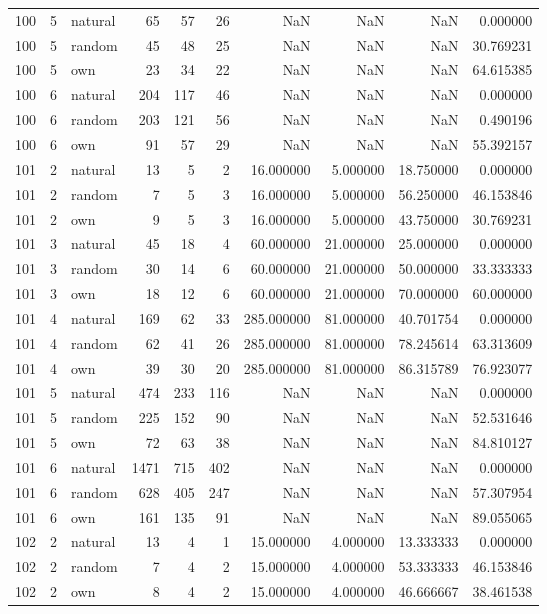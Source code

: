 \begin{table}[htbp]
\begin{tabular}{rrlrrrrrrr}
100 & 5 & natural & 65 & 57 & 26 & NaN & NaN & NaN & 0.000000 \\
100 & 5 & random & 45 & 48 & 25 & NaN & NaN & NaN & 30.769231 \\
100 & 5 & own & 23 & 34 & 22 & NaN & NaN & NaN & 64.615385 \\
100 & 6 & natural & 204 & 117 & 46 & NaN & NaN & NaN & 0.000000 \\
100 & 6 & random & 203 & 121 & 56 & NaN & NaN & NaN & 0.490196 \\
100 & 6 & own & 91 & 57 & 29 & NaN & NaN & NaN & 55.392157 \\
101 & 2 & natural & 13 & 5 & 2 & 16.000000 & 5.000000 & 18.750000 & 0.000000 \\
101 & 2 & random & 7 & 5 & 3 & 16.000000 & 5.000000 & 56.250000 & 46.153846 \\
101 & 2 & own & 9 & 5 & 3 & 16.000000 & 5.000000 & 43.750000 & 30.769231 \\
101 & 3 & natural & 45 & 18 & 4 & 60.000000 & 21.000000 & 25.000000 & 0.000000 \\
101 & 3 & random & 30 & 14 & 6 & 60.000000 & 21.000000 & 50.000000 & 33.333333 \\
101 & 3 & own & 18 & 12 & 6 & 60.000000 & 21.000000 & 70.000000 & 60.000000 \\
101 & 4 & natural & 169 & 62 & 33 & 285.000000 & 81.000000 & 40.701754 & 0.000000 \\
101 & 4 & random & 62 & 41 & 26 & 285.000000 & 81.000000 & 78.245614 & 63.313609 \\
101 & 4 & own & 39 & 30 & 20 & 285.000000 & 81.000000 & 86.315789 & 76.923077 \\
101 & 5 & natural & 474 & 233 & 116 & NaN & NaN & NaN & 0.000000 \\
101 & 5 & random & 225 & 152 & 90 & NaN & NaN & NaN & 52.531646 \\
101 & 5 & own & 72 & 63 & 38 & NaN & NaN & NaN & 84.810127 \\
101 & 6 & natural & 1471 & 715 & 402 & NaN & NaN & NaN & 0.000000 \\
101 & 6 & random & 628 & 405 & 247 & NaN & NaN & NaN & 57.307954 \\
101 & 6 & own & 161 & 135 & 91 & NaN & NaN & NaN & 89.055065 \\
102 & 2 & natural & 13 & 4 & 1 & 15.000000 & 4.000000 & 13.333333 & 0.000000 \\
102 & 2 & random & 7 & 4 & 2 & 15.000000 & 4.000000 & 53.333333 & 46.153846 \\
102 & 2 & own & 8 & 4 & 2 & 15.000000 & 4.000000 & 46.666667 & 38.461538 \\

\end{tabular}
\end{table}
